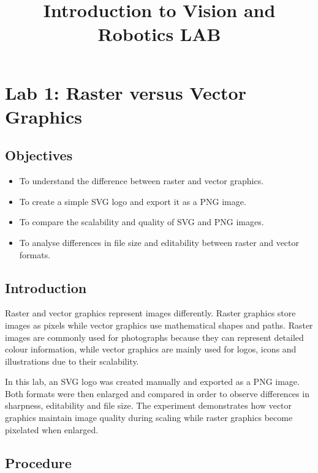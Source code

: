 \documentclass[12pt,a4paper]{article}
\title{\textbf{Introduction to Vision and Robotics LAB}}
\begin{document}
\maketitle


\section{Lab 1: Raster versus Vector Graphics}

\subsection{Objectives}

\begin{itemize}
    \item To understand the difference between raster and vector graphics.
    \item To create a simple SVG logo and export it as a PNG image.
    \item To compare the scalability and quality of SVG and PNG images.
    \item To analyse differences in file size and editability between raster and vector formats.
\end{itemize}

\subsection{Introduction}

Raster and vector graphics represent images differently. Raster graphics store images as pixels while vector graphics use mathematical shapes and paths. Raster images are commonly used for photographs because they can represent detailed colour information, while vector graphics are mainly used for logos, icons and illustrations due to their scalability.

In this lab, an SVG logo was created manually and exported as a PNG image. Both formats were then enlarged and compared in order to observe differences in sharpness, editability and file size. The experiment demonstrates how vector graphics maintain image quality during scaling while raster graphics become pixelated when enlarged.

\subsection{Procedure}
\end{document}
